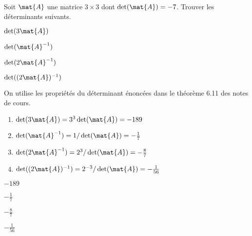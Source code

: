 \begin{exercice}
  Soit $\mat{A}$ une matrice $3 \times 3$ dont $\det(\mat{A}) = -7$.
  Trouver les déterminants suivants.
  \begin{enumerate}
    \begin{multicols}{4}
    \item $\det(3 \mat{A})$
    \item $\det(\mat{A}^{-1})$
    \item $\det(2 \mat{A}^{-1})$
    \item $\det((2 \mat{A})^{-1})$
    \end{multicols}
  \end{enumerate}
  \begin{sol}
    On utilise les propriétés du déterminant énoncées dans le théorème
    6.11 des notes de cours.
    \begin{enumerate}
    \item $\det(3 \mat{A}) = 3^3 \det(\mat{A}) = -189$
    \item $\det(\mat{A}^{-1}) = 1/\det(\mat{A}) = -\frac{1}{7}$
    \item $\det(2 \mat{A}^{-1}) = 2^3/\det(\mat{A}) = -\frac{8}{7}$
    \item $\det((2 \mat{A})^{-1}) = 2^{-3}/\det(\mat{A}) = -\frac{1}{56}$
    \end{enumerate}
  \end{sol}
  \begin{rep}
    \begin{inparaenum}
    \item $-189$
    \item $-\frac{1}{7}$
    \item $-\frac{8}{7}$
    \item $-\frac{1}{56}$
    \end{inparaenum}
  \end{rep}
\end{exercice}

